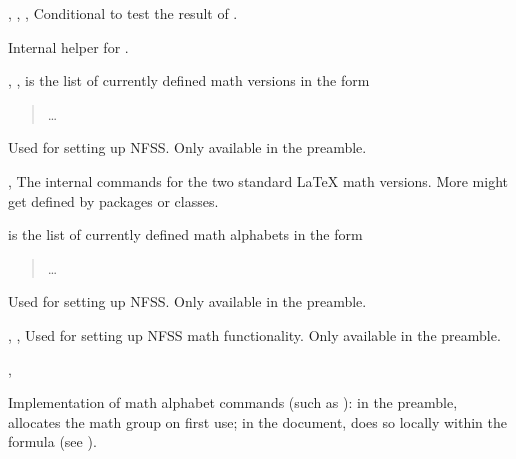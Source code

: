 \documentclass{l3in2edoc}
\begin{document}
\begin{function}[]
  {
    \ifin@,
    \in@false,
    \in@true,
  }
  Conditional to test the result of .
\end{function}





\begin{function}[int]
  {
    \in@@
  }
  Internal helper for .
\end{function}




\begin{function}[int]
  {
    \version@elt,
    \version@list,
  }
%
   is the list of currently defined math versions in the form
  \begin{quote}
     
      \ldots
  \end{quote}

  Used for setting up NFSS. Only available in the preamble.
\end{function}




\begin{function}[int]
  {
    \mv@normal,
    \mv@bold
  }
%
  The internal commands for the two standard \LaTeX{} math
  versions. More might get defined by packages or classes.
\end{function}



\begin{function}[int]
  {
    \alpha@list
  }
   is the list of currently defined math alphabets in the form
  \begin{quote}
     
      \ldots
  \end{quote}

  Used for setting up NFSS. Only available in the preamble.
\end{function}

\begin{function}[int]
  {
    \restore@mathversion,
    \init@restore@version,
    \dorestore@version
  }
%
  Used for setting up NFSS math functionality. Only available in the preamble.
\end{function}




\begin{function}[int]
  {
    \select@group,
    \document@select@group
  }
  \begin{syntax}
        
  \end{syntax}
  Implementation of math alphabet commands (such as ): in
  the preamble,  allocates the math group on first
  use; in the document,  does so locally
  within the formula (see ).
\end{function}
\end{document}
